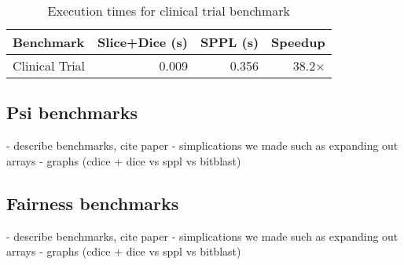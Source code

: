 \begin{table}[!t]
\centering
\begin{tabular}{lrrr}
\toprule
Benchmark & Slice+Dice (s) & SPPL (s) & Speedup \\
\midrule
Clinical Trial & 0.009 & 0.356 & 38.2× \\
\bottomrule
\end{tabular}
\caption{Execution times for clinical trial benchmark}
\end{table}


\subsection{Psi benchmarks}\label{sec:psi-benchmarks}
- describe benchmarks, cite paper
- simplications we made such as expanding out arrays
- graphs (cdice + dice vs sppl vs bitblast)


\subsection{Fairness benchmarks}\label{sec:fairness-benchmarks}
- describe benchmarks, cite paper
- simplications we made such as expanding out arrays
- graphs (cdice + dice vs sppl vs bitblast)

